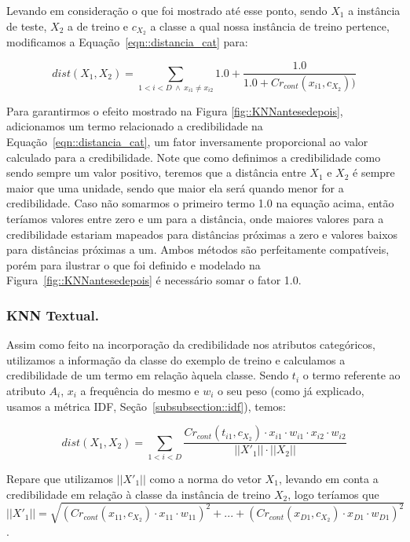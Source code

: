 Levando em consideração o que foi mostrado até esse ponto, sendo $X_1$ a instância de teste, $X_2$ a de treino e $c_{X_2}$ a classe a qual nossa instância de treino pertence, modificamos a Equação~\ref{eqn::distancia_cat} para:

\begin{equation} \label{eqn::distancia_cat_cred}
   dist(X_1, X_2) = \sum_{1 < i < D\ \wedge \ x_{i1} \neq x_{i2}} 1.0 + \frac{1.0}{1.0 + Cr_{cont}(x_{i1}, c_{X_2} ))}
\end{equation}

Para garantirmos o efeito mostrado na Figura \ref{fig::KNNantesedepois}, adicionamos um termo relacionado a credibilidade na Equação~\ref{eqn::distancia_cat}, um fator inversamente proporcional ao valor calculado para a credibilidade. Note que como definimos a credibilidade como sendo sempre um valor positivo, teremos que a distância entre $X_1$ e $X_2$ é sempre maior que uma unidade, sendo que maior ela será quando menor for a credibilidade. Caso não somarmos o primeiro termo 1.0 na equação acima, então teríamos valores entre zero e um para a distância, onde maiores valores para a credibilidade estariam mapeados para distâncias próximas a zero e valores baixos para distâncias próximas a um. Ambos métodos são perfeitamente compatíveis, porém para ilustrar o que foi definido e modelado na Figura~\ref{fig::KNNantesedepois} é necessário somar o fator 1.0. 


\subsubsection{\textsc{KNN} Textual.}
\label{subsubsec::knntexto}

Assim como feito na incorporação da credibilidade nos atributos categóricos, utilizamos a informação da classe do exemplo de treino e calculamos a credibilidade de um termo em relação àquela classe. Sendo $t_i$ o termo referente ao atributo $A_i$, $x_i$ a frequência do mesmo e $w_i$ o seu peso (como já explicado, usamos a métrica \textsc{IDF}, Seção~\ref{subsubsection::idf}), temos:

\begin{equation}\label{eqn::distancia_texto_cat}
    dist(X_1, X_2) = \sum\limits_{1 < i < D}\frac{  Cr_{cont}(t_{i1}, c_{X_2}) \cdot x_{i1} \cdot w_{i1} \cdot x_{i2} \cdot w_{i2} }{ ||X'_1|| \cdot ||X_2|| }
\end{equation}

Repare que utilizamos $||X'_1||$ como a norma do vetor $X_1$, levando em conta a credibilidade em relação à classe da instância de treino $X_2$, logo teríamos que $||X'_1|| = \sqrt{ ( Cr_{cont}(x_{11}, c_{X_2}) \cdot x_{11} \cdot w_{11} )^2 + ... +  ( Cr_{cont}(x_{D1}, c_{X_2}) \cdot x_{D1} \cdot w_{D1} )^2}$.

